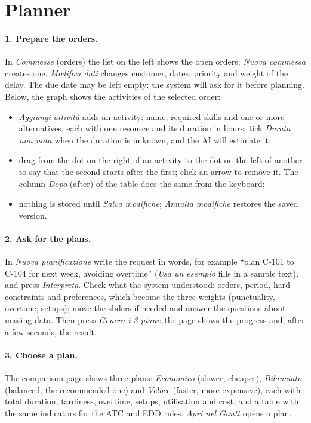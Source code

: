 \section{Planner}
\label{sec:ug-planner}

\paragraph{1. Prepare the orders.} In \emph{Commesse} (orders) the list on the left shows the open
orders; \emph{Nuova commessa} creates one, \emph{Modifica dati} changes customer, dates, priority
and weight of the delay. The due date may be left empty: the system will ask for it before
planning. Below, the graph shows the activities of the selected order:
\begin{itemize}
  \item \emph{Aggiungi attività} adds an activity: name, required skills and one or more
        alternatives, each with one resource and its duration in hours; tick
        \emph{Durata non nota} when the duration is unknown, and the AI will estimate it;
  \item drag from the dot on the right of an activity to the dot on the left of another to say
        that the second starts after the first; click an arrow to remove it. The column
        \emph{Dopo} (after) of the table does the same from the keyboard;
  \item nothing is stored until \emph{Salva modifiche}; \emph{Annulla modifiche} restores the
        saved version.
\end{itemize}

\paragraph{2. Ask for the plans.} In \emph{Nuova pianificazione} write the request in words,
for example ``plan C-101 to C-104 for next week, avoiding overtime'' (\emph{Usa un esempio}
fills in a sample text), and press \emph{Interpreta}. Check what the system understood: orders, period, hard constraints and preferences,
which become the three weights (punctuality, overtime, setups); move the sliders if needed and
answer the questions about missing data. Then press \emph{Genera i 3 piani}: the page shows the
progress and, after a few seconds, the result.

\paragraph{3. Choose a plan.} The comparison page shows three plans: \emph{Economico}
(slower, cheaper), \emph{Bilanciato} (balanced, the recommended one) and \emph{Veloce} (faster,
more expensive), each with total duration, tardiness, overtime, setups, utilisation and cost,
and a table with the same indicators for the ATC and EDD rules. \emph{Apri nel Gantt} opens a
plan.

